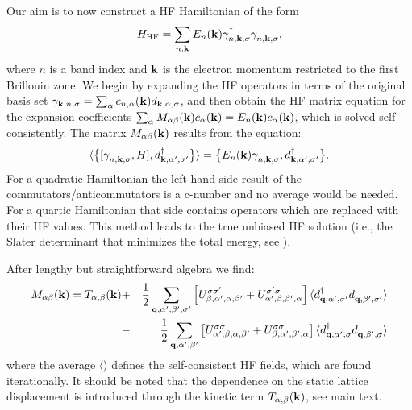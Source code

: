 \documentclass[showpacs,preprintnumbers,amsmath,amssymb,prl,aps,onecolumn,superscriptaddress]{revtex4}
\newcommand{\bk}{{\bf k}}
\newcommand{\bq}{{\bf q}}
\begin{document}
Our aim is to now construct a HF Hamiltonian of the form  
\begin{equation}
    H_{\rm HF} = \sum_{n,\bk} E_n(\bk)\gamma^\dagger_{n,\bk,\sigma}\gamma^{\phantom\dagger}_{n,\bk,\sigma}, 
\end{equation}
where $n$ is a band index and $\bk$ is the electron momentum
restricted to the first Brillouin zone. 
We begin by expanding the HF operators in terms of the original basis set 
$\gamma_{\bk,n,\sigma} = \sum_{\alpha}
c_{n,\alpha}(\bk)d_{\bk,\alpha,\sigma}$, and then obtain the HF matrix
equation for the expansion coefficients   
$\sum_{\alpha} M_{\alpha\beta}(\bk) c_{\alpha}(\bk) = E_n(\bk)c_\alpha(\bk)$, 
which is solved self-consistently. The matrix $M_{\alpha\beta}(\bk)$
results from the equation:
\begin{equation}
   \langle \big\{[\gamma^{\phantom\dagger}_{n,\bk,\sigma},H], d^\dagger_{\bk,\alpha^\prime,\sigma^\prime}\big\} \rangle= 
    \big\{ E_n(\bk)\gamma^{\phantom\dagger}_{n,\bk,\sigma},d^\dagger_{\bk,\alpha^\prime,\sigma^\prime} \big\}.
\end{equation} 
For a quadratic Hamiltonian the left-hand side result of the
commutators/anticommutators is a c-number and no average would be
needed. For a quartic Hamiltonian that side contains operators which
are replaced with their HF values. This method leads to  the true
unbiased HF solution
(i.e., the Slater determinant that minimizes the total energy, see
\cite{MeanField}). 

After lengthy but straightforward algebra we find:
\begin{eqnarray}
M_{\alpha\beta}(\bk)=T_{\alpha,\beta}(\bk)&+&\frac{1}{2}\sum_{\bq,\alpha^\prime,\beta^\prime,\sigma^\prime} 
    \left[ U^{\sigma\sigma^\prime}_{\beta,\alpha^\prime,\alpha,\beta^\prime} + 
           U^{\sigma^\prime\sigma}_{\alpha^\prime,\beta,\beta^\prime,\alpha}
    \right] \langle d^\dagger_{\bq,\alpha^\prime,\sigma^\prime}d^{\phantom\dagger}_{\bq,\beta^\prime,\sigma^\prime} \rangle 
    \\ \nonumber 
 &-&\frac{1}{2}\sum_{\bq,\alpha^\prime,\beta^\prime} 
    \left[U^{\sigma\sigma}_{\alpha^\prime,\beta,\alpha,\beta^\prime} + 
          U^{\sigma\sigma}_{\beta,\alpha^\prime,\beta^\prime,\alpha}\right]
    \langle d^\dagger_{\bq,\alpha^\prime,\sigma}d^{\phantom\dagger}_{\bq,\beta^\prime,\sigma} \rangle 
\end{eqnarray}
where the average $\langle  \rangle$ defines the
self-consistent HF fields, which  are found iterationally. 
 It should be noted that the dependence on the static lattice displacement is 
introduced through the kinetic term $T_{\alpha,\beta}(\bk)$, see main text.  
\end{document}
